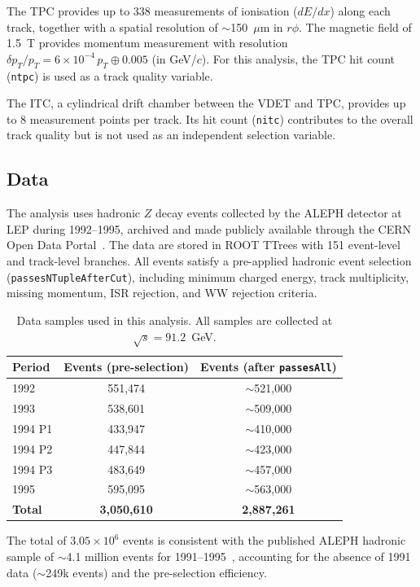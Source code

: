 \documentclass[11pt,a4paper]{article}
\begin{document}
The TPC provides up to 338 measurements of ionisation ($dE/dx$)
along each track, together with a spatial resolution of
$\sim$150~$\mu$m in $r\phi$.
The magnetic field of 1.5~T provides momentum measurement with
resolution $\delta p_T / p_T = 6 \times 10^{-4}\, p_T \oplus
0.005$ (in GeV/$c$).
For this analysis, the TPC hit count (\texttt{ntpc}) is used as
a track quality variable.

The ITC, a cylindrical drift chamber between the VDET and TPC,
provides up to 8 measurement points per track.
Its hit count (\texttt{nitc}) contributes to the overall track
quality but is not used as an independent selection variable.

\subsection{Data}
\label{sec:data:data}

The analysis uses hadronic $Z$ decay events collected by the ALEPH
detector at LEP during 1992--1995, archived and made publicly
available through the CERN Open Data Portal~\cite{ALEPH:opendata}.
The data are stored in ROOT TTrees with 151 event-level and
track-level branches.
All events satisfy a pre-applied hadronic event selection
(\texttt{passesNTupleAfterCut}), including minimum charged energy,
track multiplicity, missing momentum, ISR rejection, and WW rejection
criteria.

\begin{table}[htbp]
\centering
\caption{Data samples used in this analysis. All samples are
collected at $\sqrt{s} = 91.2$~GeV.}
\label{tbl:data}
\begin{tabular}{lcc}
\toprule
Period & Events (pre-selection) & Events (after \texttt{passesAll}) \\
\midrule
1992 & 551,474 & $\sim$521,000 \\
1993 & 538,601 & $\sim$509,000 \\
1994 P1 & 433,947 & $\sim$410,000 \\
1994 P2 & 447,844 & $\sim$423,000 \\
1994 P3 & 483,649 & $\sim$457,000 \\
1995 & 595,095 & $\sim$563,000 \\
\midrule
\textbf{Total} & \textbf{3,050,610} & \textbf{2,887,261} \\
\bottomrule
\end{tabular}
\end{table}

The total of $3.05 \times 10^6$ events is consistent with the
published ALEPH hadronic sample of $\sim$4.1 million events for
1991--1995~\cite{ALEPH:AFBb}, accounting for the absence of 1991
data ($\sim$249k events) and the pre-selection efficiency.
\end{document}
